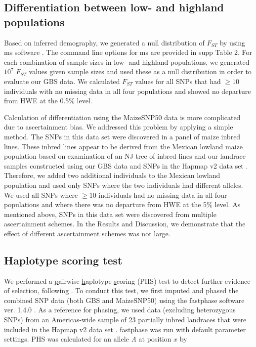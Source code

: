 \subsection*{Differentiation between low- and highland populations}
Based on inferred demography, we generated a null distribution of $F_{ST}$ by using {\sf ms} software \cite[]{Hudson_2002_11847089}.   
The command line options for {\sf ms} are provided in supp Table 2.  
For each combination of sample sizes in low- and highland populations, we generated $10^7$ $F_{ST}$ values given sample sizes and used these as a null distribution in order to evaluate our GBS data.   We calculated $F_{ST}$ values for all SNPs that had $\geq10$ individuals with no missing data in all four populations and showed no departure from HWE at the 0.5\% level. 

Calculation of differentiation using the MaizeSNP50 data is more complicated due to ascertainment bias.  
We addressed this problem by applying a simple method.  
The SNPs in this data set were discovered in a panel of maize inbred lines.  
These inbred lines appear to be derived from the Mexican lowland maize population based on examination of an NJ tree of inbred lines and our landrace samples constructed using our GBS data and SNPs in the Hapmap v2 data set \cite[]{Hufford_2012_22660546}. 
Therefore, we added two additional individuals to the Mexican lowland population and used only SNPs where the two individuals had different alleles.   
We used all SNPs where $\geq10$ individuals had no missing data in all four populations and where there was no departure from HWE at the 5\% level. As mentioned above, SNPs in this data set were discovered from multiple ascertainment schemes.  In the Results and Discussion, we demonstrate that the effect of different ascertainment schemes was not large.

\subsection*{Haplotype scoring test}
We performed a \underline{p}airwise \underline{h}aplotype \underline{s}coring (PHS) test to detect further evidence of selection, following \cite{Toomajian_2006_16623598}.  
To conduct this test, we first imputed and phased the combined SNP data (both GBS and MaizeSNP50) using the {\sf fastphase} software ver. 1.4.0 \cite[]{Scheet_2006_16532393}.  
As a reference for phasing, we used data (excluding heterozygous SNPs) from an Americas-wide sample of 23 partially inbred landraces that were included in the Hapmap v2 data set  \cite[]{Hufford_2012_22660546}.  
{\sf fastphase} was run with default parameter settings.  PHS was calculated for an allele \emph{A} at position $x$ by

